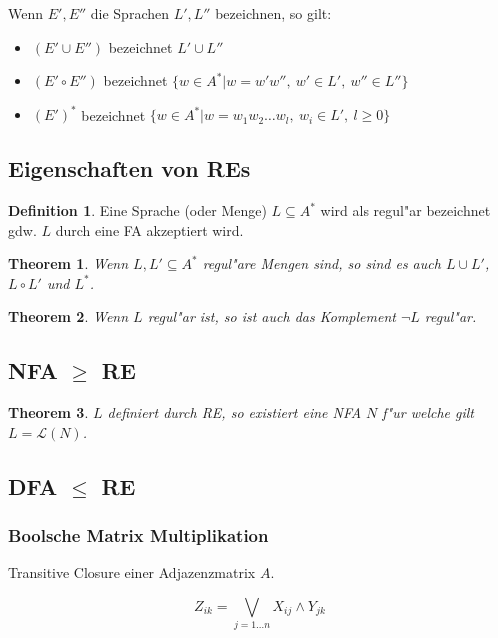 \documentclass[german, 10pt, a4paper, twocolumn]{scrartcl}
\newtheorem{theorem}{Theorem}[section]
\theoremstyle{definition}
\newtheorem*{definition}{Definition}
\theoremstyle{example}
\begin{document}
Wenn $E',E''$ die Sprachen $L', L''$ bezeichnen, so gilt:
\begin{itemize}
	\item $( E' \cup E'' )$ bezeichnet $L' \cup L''$
	\item $( E' \circ E'' )$ bezeichnet $\{ w \in A^* | w = w'w'',\: w'\in L',\: w''\in L'' \}$
	\item $( E' )^{*}$ bezeichnet $\{ w\in A^* | w = w_1 w_2 \ldots w_l,\: w_i \in L', \: l \geq 0 \}$
\end{itemize}

\subsection{Eigenschaften von REs}

\begin{definition}
	Eine Sprache (oder Menge) $L \subseteq A^*$ wird als regul"ar bezeichnet gdw. $L$ durch eine FA akzeptiert wird.
\end{definition}

\begin{theorem}
	Wenn $L, L' \subseteq A^*$ regul"are Mengen sind, so sind es auch $L \cup L'$, $L \circ L'$ und $L^*$.
\end{theorem}

\begin{theorem}
	Wenn $L$ regul"ar ist, so ist auch das Komplement $\lnot L$ regul"ar.
\end{theorem}

\subsection{NFA $\geq$ RE}

\begin{theorem}
	$L$ definiert durch RE, so existiert eine NFA $N$ f"ur welche gilt $L = \mathcal{L}(N)$.
\end{theorem}

\subsection{DFA $\leq$ RE}

\subsubsection{Boolsche Matrix Multiplikation}

Transitive Closure einer Adjazenzmatrix $A$.

\begin{displaymath}
	Z_{ik} = \bigvee_{j=1\ldots n} X_{ij} \land Y_{jk}
\end{displaymath}
\end{document}
